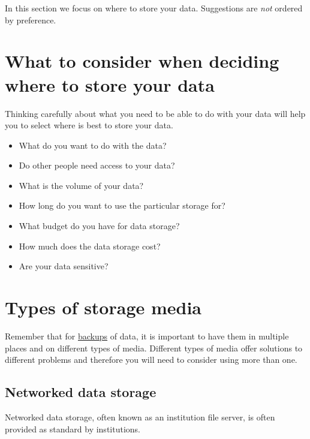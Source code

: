 \documentclass[a4paper,oneside]{report}
\providecommand{\tightlist}{%
  \setlength{\itemsep}{0pt}\setlength{\parskip}{0pt}}
\begin{document}
In this section we focus on where to store your data. Suggestions are
\emph{not} ordered by preference.

\hypertarget{what-to-consider-when-deciding-where-to-store-your-data}{%
\section{What to consider when deciding where to store your
data}\label{what-to-consider-when-deciding-where-to-store-your-data}}

Thinking carefully about what you need to be able to do with your data
will help you to select where is best to store your data.

\begin{itemize}
\tightlist
\item
  What do you want to do with the data?
\item
  Do other people need access to your data?
\item
  What is the volume of your data?
\item
  How long do you want to use the particular storage for?
\item
  What budget do you have for data storage?
\item
  How much does the data storage cost?
\item
  Are your data sensitive?
\end{itemize}

\hypertarget{types-of-storage-media}{%
\section{Types of storage media}\label{types-of-storage-media}}

Remember that for \protect\hyperlink{data-backup}{backups} of data, it
is important to have them in multiple places and on different types of
media. Different types of media offer solutions to different problems
and therefore you will need to consider using more than one.

\hypertarget{networked-data-storage}{%
\subsection{Networked data storage}\label{networked-data-storage}}

Networked data storage, often known as an institution file server, is
often provided as standard by institutions.
\end{document}
